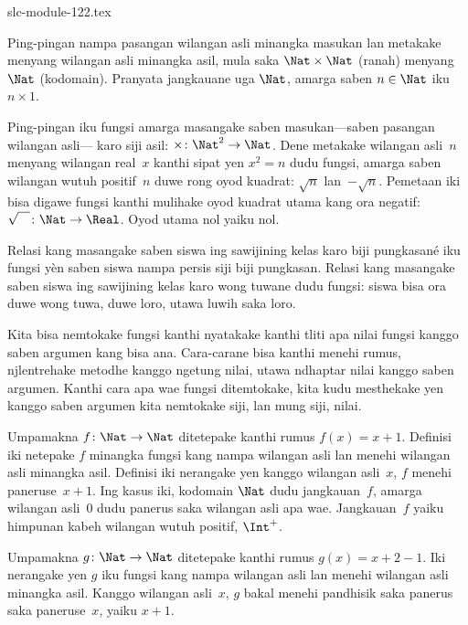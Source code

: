 \begin{filecontents*}[overwrite]{slc-module-122.tex}
\begin{ex}
Ping-pingan nampa pasangan wilangan asli
minangka masukan lan metakake menyang wilangan
asli minangka asil, mula saka
$\Nat \times \Nat$ (ranah) menyang $\Nat$ (kodomain).
Pranyata jangkauane uga $\Nat$,
amarga saben $n \in \Nat$ iku $n \times 1$.
\end{ex}

\begin{ex}
Ping-pingan iku fungsi amarga masangake saben
masukan---saben pasangan wilangan asli---
karo siji asil: $\times \colon \Nat^2 \to\Nat$.
Dene metakake wilangan asli~$n$
menyang wilangan real~$x$ kanthi sipat yen
$x^2 = n$ dudu fungsi, amarga saben
wilangan wutuh positif~$n$ duwe rong
oyod kuadrat: $\sqrt{n}$ lan~$-\sqrt{n}$.
Pemetaan iki bisa digawe fungsi kanthi
mulihake oyod kuadrat utama kang ora negatif:
$\sqrt{\phantom{X}} \colon\Nat \to \Real$.
Oyod utama nol yaiku nol.
\end{ex}

\begin{ex}
Relasi kang masangake saben siswa ing sawijining
kelas karo biji pungkasané iku fungsi yèn
saben siswa nampa persis siji biji pungkasan.
Relasi kang masangake saben siswa ing sawijining
kelas karo wong tuwane dudu fungsi:
siswa bisa ora duwe wong tuwa, duwe loro,
utawa luwih saka loro.
\end{ex}

\begin{explain}
Kita bisa nemtokake fungsi kanthi nyatakake
kanthi tliti apa nilai fungsi kanggo saben
argumen kang bisa ana. Cara-carane bisa
kanthi menehi rumus, njlentrehake metodhe
kanggo ngetung nilai, utawa ndhaptar
nilai kanggo saben argumen.
Kanthi cara apa wae fungsi ditemtokake,
kita kudu mesthekake yen kanggo saben
argumen kita nemtokake siji, lan mung siji, nilai.
\end{explain}


\begin{ex}
Umpamakna $f \colon \Nat \to \Nat$
ditetepake kanthi rumus $f(x) = x+1$.
Definisi iki netepake $f$ minangka fungsi
kang nampa wilangan asli lan menehi
wilangan asli minangka asil.
Definisi iki nerangake yen kanggo wilangan
asli~$x$, $f$ menehi paneruse~$x+1$.
Ing kasus iki, kodomain $\Nat$ dudu
jangkauan~$f$, amarga wilangan asli~$0$
dudu panerus saka wilangan asli apa wae.
Jangkauan~$f$ yaiku himpunan kabeh
wilangan wutuh positif, $\Int^{+}$.
\end{ex}

\begin{ex}
Umpamakna $g \colon \Nat \to \Nat$
ditetepake kanthi rumus $g(x) = x+2-1$.
Iki nerangake yen $g$ iku fungsi kang
nampa wilangan asli lan menehi
wilangan asli minangka asil.
Kanggo wilangan asli~$x$, $g$ bakal
menehi pandhisik saka panerus saka
paneruse~$x$, yaiku $x+1$.
\end{ex}


\end{filecontents*}
